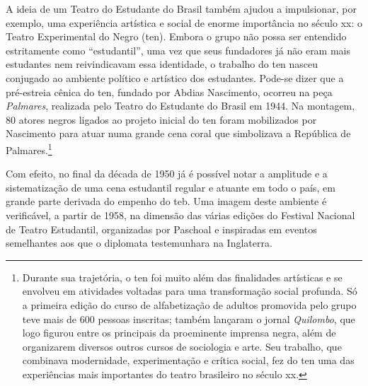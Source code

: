 A ideia de um Teatro do Estudante do Brasil também ajudou a impulsionar,
por exemplo, uma experiência artística e social de enorme importância no
século {\sc xx}: o Teatro Experimental do Negro ({\sc ten}). Embora o grupo não
possa ser entendido estritamente como “estudantil”, uma vez que seus
fundadores já não eram mais estudantes nem reivindicavam essa
identidade, o trabalho do {\sc ten} nasceu conjugado ao ambiente político e
artístico dos estudantes. Pode-se dizer que a pré-estreia cênica do {\sc ten},
fundado por Abdias Nascimento, ocorreu na peça {\it Palmares},
realizada pelo Teatro do Estudante do Brasil em 1944. Na montagem, 80
atores negros ligados ao projeto inicial do {\sc ten} foram mobilizados por
Nascimento para atuar numa grande cena coral que simbolizava a República
de Palmares.\footnote{Durante sua trajetória, o {\sc ten} foi
  muito além das finalidades artísticas e se envolveu em atividades
  voltadas para uma transformação social profunda. Só a primeira edição
  do curso de alfabetização de adultos promovida pelo grupo teve mais de
  600 pessoas inscritas; também lançaram o jornal {\it Quilombo}, que logo
  figurou entre os principais da proeminente imprensa negra, além de
  organizarem diversos outros cursos de sociologia e arte. Seu trabalho, que combinava
  modernidade, experimentação e crítica social, fez do {\sc ten} uma das
  experiências mais importantes do teatro brasileiro no século {\sc xx}.}

Com efeito, no final da década de 1950 já é possível notar a amplitude e
a sistematização de uma cena estudantil regular e atuante em todo o país,
em grande parte derivada do empenho do {\sc teb}. Uma imagem deste
ambiente é verificável, a partir de 1958, na dimensão das várias edições
do Festival Nacional de Teatro Estudantil, organizadas por Paschoal e
inspiradas em eventos semelhantes aos que o diplomata testemunhara na
Inglaterra.

